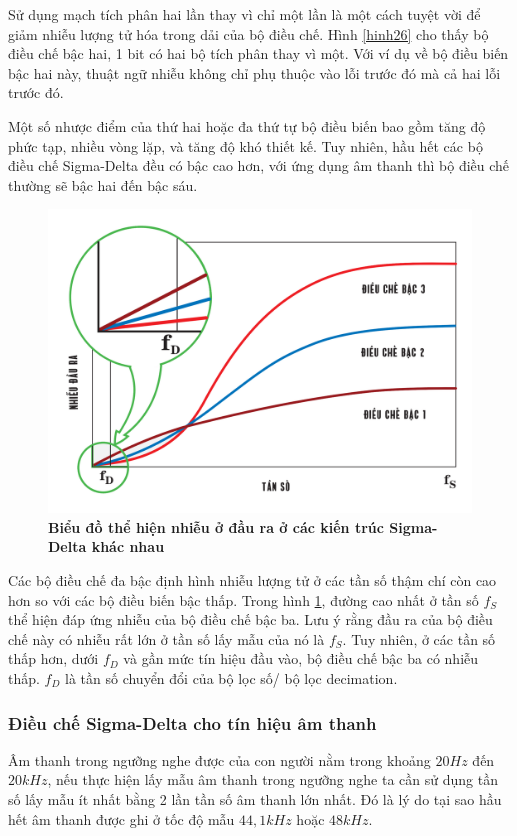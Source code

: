 Sử dụng mạch tích phân hai lần thay vì chỉ một lần là một cách tuyệt vời để giảm nhiễu lượng tử hóa trong dải của bộ điều chế. Hình \ref{hinh26} cho thấy bộ điều chế bậc hai, 1 bit có hai bộ tích phân thay vì một. Với ví dụ về bộ điều biến bậc hai này, thuật ngữ nhiễu không chỉ phụ thuộc vào lỗi trước đó mà cả hai lỗi trước đó.

Một số nhược điểm của thứ hai hoặc đa thứ tự bộ điều biến bao gồm tăng độ phức tạp, nhiều vòng lặp, và tăng độ khó thiết kế. Tuy nhiên, hầu hết các bộ điều chế Sigma-Delta đều có bậc cao hơn, với ứng dụng âm thanh thì bộ điều chế thường sẽ bậc hai đến bậc sáu.

\begin{figure}[!ht]
    \centering
    \includegraphics[width=12cm]{Images/Chuong2/bieudoDS.png}
    \caption[Biểu đồ thể hiện nhiễu ở đầu ra ở các kiến trúc Sigma-Delta khác nhau]{\bfseries \fontsize{12pt}{0pt}\selectfont Biểu đồ thể hiện nhiễu ở đầu ra ở các kiến trúc Sigma-Delta khác nhau}
    \label{hinh27}
\end{figure}

Các bộ điều chế đa bậc định hình nhiễu lượng tử ở các tần số thậm chí còn cao hơn so với các bộ điều biến bậc thấp. Trong hình \ref{hinh27}, đường cao nhất ở tần số $f_S$ thể hiện đáp ứng nhiễu của bộ điều chế bậc ba. Lưu ý rằng đầu ra của bộ điều chế này có nhiễu rất lớn ở tần số lấy mẫu của nó là $f_S$. Tuy nhiên, ở các tần số thấp hơn, dưới $f_D$ và gần mức tín hiệu đầu vào, bộ điều chế bậc ba có nhiễu thấp. $f_D$ là tần số chuyển đổi của bộ lọc số/ bộ lọc decimation.
\subsubsection{Điều chế Sigma-Delta cho tín hiệu âm thanh}
Âm thanh trong ngưỡng nghe được của con người nằm trong khoảng $20Hz$ đến 
$20kHz$, nếu thực hiện lấy mẫu âm thanh trong ngưỡng nghe ta cần sử dụng tần số lấy 
mẫu ít nhất bằng 2 lần tần số âm thanh lớn nhất. Đó là lý do tại sao hầu hết âm thanh được ghi ở tốc độ mẫu $44,1kHz$ hoặc $48kHz$.

